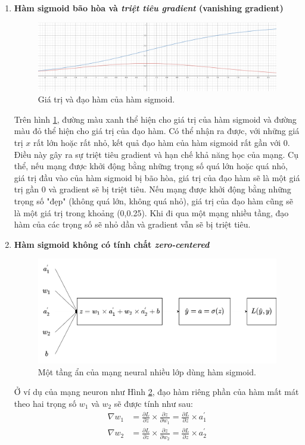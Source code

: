 \begin{enumerate}
    \item \textbf{Hàm sigmoid bão hòa và \textit{triệt tiêu gradient} (vanishing gradient)}
    \begin{figure}[!h]
	\centering
		\includegraphics[width=0.75\columnwidth]{chapter03/figure/VanishingGradient.png}
        \caption{Giá trị và đạo hàm của hàm sigmoid.}
        \label{fig:VanishingGradient}
		\centering
    \end{figure}
    
    Trên hình \ref{fig:VanishingGradient}, đường màu xanh thể hiện cho giá trị của hàm sigmoid và đường màu đỏ thể hiện cho giá trị của đạo hàm. Có thể nhận ra được, với những giá trị $x$ rất lớn hoặc rất nhỏ, kết quả đạo hàm của hàm sigmoid rất gần với 0. Điều này gây ra sự triệt tiêu gradient và hạn chế khả năng học của mạng. Cụ thể, nếu mạng được khởi động bằng những trọng số quá lớn hoặc quá nhỏ, giá trị đầu vào của hàm sigmoid bị bão hòa, giá trị của đạo hàm sẽ là một giá trị gần 0 và gradient sẽ bị triệt tiêu. Nếu mạng được khởi động bằng những trọng số "đẹp" (không quá lớn, không quá nhỏ), giá trị của đạo hàm cũng sẽ là một giá trị trong khoảng (0,0.25). Khi đi qua một mạng nhiều tầng, đạo hàm của các trọng số sẽ nhỏ dần và gradient vẫn sẽ bị triệt tiêu.
    \item \textbf{Hàm sigmoid không có tính chất \textit{zero-centered}}
    \begin{figure}[!h]
	\centering
		\includegraphics[width=0.5\columnwidth]{chapter03/figure/ZeroCentered.png}
        \caption{Một tầng ẩn của mạng neural nhiều lớp dùng hàm sigmoid.}
        \label{fig:ZeroCentered}
		\centering
    \end{figure}
    
    Ở ví dụ của mạng neuron như Hình \ref{fig:ZeroCentered}, đạo hàm riêng phần của hàm mất mát theo hai trọng số $w_1$ và $w_2$ sẽ được tính như sau:
    \begin{align*}
        \nabla w_{1} &= \frac{\partial L}{\partial z} \times \frac{\partial z}{\partial w_1} = \frac{\partial L}{\partial z} \times a^{'}_1\\
        \nabla w_{2} &= \frac{\partial L}{\partial z} \times \frac{\partial z}{\partial w_2} = \frac{\partial L}{\partial z} \times a^{'}_2
    \end{align*}
    

\end{enumerate}
